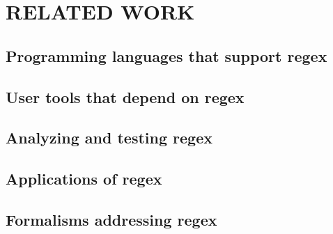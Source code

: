 \chapter{RELATED WORK}

\section{Programming languages that support regex}

\section{User tools that depend on regex}

\section{Analyzing and testing regex}

\section{Applications of regex}

\section{Formalisms addressing regex}
